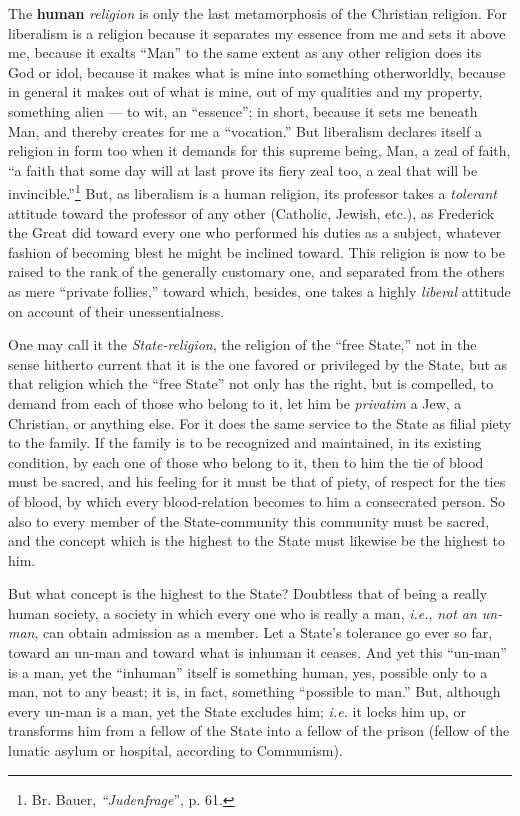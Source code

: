 The \textbf{human} \textit{religion} is only the last metamorphosis of the 
Christian religion. For liberalism is a religion because it separates my 
essence from me and sets it above me, because it exalts ``Man'' to the same 
extent as any other religion does its God or idol, because it makes what is 
mine into something otherworldly, because in general it makes out of what is 
mine, out of my qualities and my property, something alien --- to wit, an 
``essence''; in short, because it sets me beneath Man, and thereby creates 
for me a ``vocation.'' But liberalism declares itself a religion in form too 
when it demands for this supreme being, Man, a zeal of faith, ``a faith that 
some day will at last prove its fiery zeal too, a zeal that will be 
invincible.''\footnote{Br. Bauer, \textit{``Judenfrage}'', p. 61.} But, as 
liberalism is a human religion, its professor takes a \textit{tolerant} 
attitude toward the professor of any other (Catholic, Jewish, etc.), as 
Frederick the Great did toward every one who performed his duties as a 
subject, whatever fashion of becoming blest he might be inclined toward. This 
religion is now to be raised to the rank of the generally customary one, and 
separated from the others as mere ``private follies,'' toward which, 
besides, one takes a highly \textit{liberal} attitude on account of their 
unessentialness.

One may call it the \textit{State-religion}, the religion of the ``free 
State,'' not in the sense hitherto current that it is the one favored or 
privileged by the State, but as that religion which the ``free State'' not 
only has the right, but is compelled, to demand from each of those who belong 
to it, let him be \textit{privatim} a Jew, a Christian, or anything else. For 
it does the same service to the State as filial piety to the family. If the 
family is to be recognized and maintained, in its existing condition, by each 
one of those who belong to it, then to him the tie of blood must be sacred, 
and his feeling for it must be that of piety, of respect for the ties of 
blood, by which every blood-relation becomes to him a consecrated person. So 
also to every member of the State-community this community must be sacred, and 
the concept which is the highest to the State must likewise be the highest to 
him.

But what concept is the highest to the State? Doubtless that of being a really 
human society, a society in which every one who is really a man, \textit{i.e.},
\textit{not an un-man}, can obtain admission as a member. Let a State's 
tolerance go ever so far, toward an un-man and toward what is inhuman it 
ceases. And yet this ``un-man'' is a man, yet the ``inhuman'' itself is 
something human, yes, possible only to a man, not to any beast; it is, in 
fact, something ``possible to man.'' But, although every un-man is a man, 
yet the State excludes him; \textit{i.e.} it locks him up, or transforms him 
from a fellow of the State into a fellow of the prison (fellow of the lunatic 
asylum or hospital, according to Communism).

